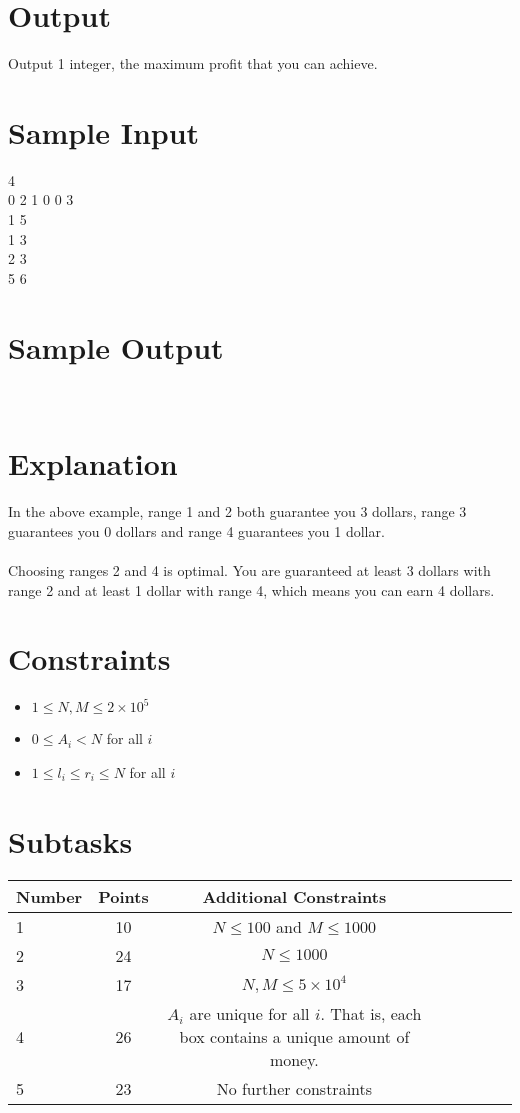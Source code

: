 \documentclass{article}
\begin{document}
\section*{Output}
Output 1 integer, the maximum profit that you can achieve. 
\section*{Sample Input}
{ 4\\
0 2 1 0 0 3\\
1 5\\
1 3\\
2 3\\
5 6\\
}
\section*{Sample Output}
{ \\
}
\section*{Explanation}
In the above example, range 1 and 2 both guarantee you 3 dollars, range 3 guarantees you 0 dollars and range 4 guarantees you 1 dollar. \\
\\ Choosing ranges 2 and 4 is optimal. You are guaranteed at least 3 dollars with range 2 and at least 1 dollar with range 4, which means you can earn 4 dollars.
\section*{Constraints}
\begin{itemize}
\item $1\leq N , M\leq 2\times 10^5$
\item $0 \leq A_i < N$ for all $i$
\item $1 \leq l_i \leq r_i \leq N$ for all $i$
\end{itemize}
\section*{Subtasks}
\begin{tabular}{l*{6}{c}r}
Number & Points & Additional Constraints\\
\hline
1 & 10 & $N \leq 100$ and $M \leq 1000$ \\
2 & 24 & $N \leq 1000$ \\
3 & 17 & $N,M \leq 5 \times 10^4$ \\
4 & 26 & $A_i$ are unique for all $i$. That is, each box contains a unique amount of money. \\
5 & 23 & No further constraints \\

\end{tabular}
\end{document}
